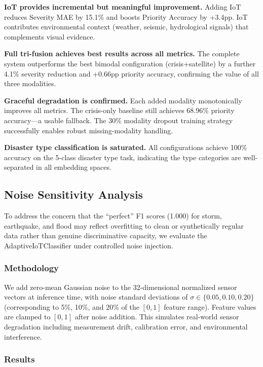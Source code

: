 \documentclass[journal]{IEEEtran}
\begin{document}
\textbf{IoT provides incremental but meaningful improvement.} Adding IoT reduces Severity MAE by 15.1\% and boosts Priority Accuracy by +3.4pp. IoT contributes environmental context (weather, seismic, hydrological signals) that complements visual evidence.

\textbf{Full tri-fusion achieves best results across all metrics.} The complete system outperforms the best bimodal configuration (crisis+satellite) by a further 4.1\% severity reduction and +0.66pp priority accuracy, confirming the value of all three modalities.

\textbf{Graceful degradation is confirmed.} Each added modality monotonically improves all metrics. The crisis-only baseline still achieves 68.96\% priority accuracy---a usable fallback. The 30\% modality dropout training strategy successfully enables robust missing-modality handling.

\textbf{Disaster type classification is saturated.} All configurations achieve 100\% accuracy on the 5-class disaster type task, indicating the type categories are well-separated in all embedding spaces.

\subsection{Noise Sensitivity Analysis}
\label{sec:noise_sensitivity}

To address the concern that the ``perfect'' F1 scores (1.000) for storm, earthquake, and flood may reflect overfitting to clean or synthetically regular data rather than genuine discriminative capacity, we evaluate the AdaptiveIoTClassifier under controlled noise injection.

\subsubsection{Methodology}

We add zero-mean Gaussian noise to the 32-dimensional normalized sensor vectors at inference time, with noise standard deviations of $\sigma \in \{0.05, 0.10, 0.20\}$ (corresponding to 5\%, 10\%, and 20\% of the $[0, 1]$ feature range). Feature values are clamped to $[0, 1]$ after noise addition. This simulates real-world sensor degradation including measurement drift, calibration error, and environmental interference.

\subsubsection{Results}
\end{document}
